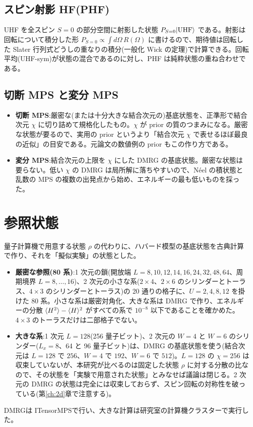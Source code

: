 \subsection{スピン射影 HF(PHF)}
UHF を全スピン $S=0$ の部分空間に射影した状態 $P_{S=0}|\rm UHF\rangle$ である\cite{jimenezhoyos2012}。射影は回転について積分した形 $P_{S=0}\propto\int d\Omega\,R(\Omega)$ に書けるので、期待値は回転した Slater 行列式どうしの重なりの積分(一般化 Wick の定理)で計算できる。回転平均(UHF-sym)が状態の混合であるのに対し、PHF は純粋状態の重ね合わせである。

\subsection{切断 MPS と変分 MPS}
\begin{itemize}
  \item \textbf{切断 MPS}:厳密な(または十分大きな結合次元の)基底状態を、正準形で結合次元 $\chi$ に切り詰めて規格化したもの。$\chi$ が prior の質のつまみになる。厳密な状態が要るので、実用の prior というより「結合次元 $\chi$ で表せるほぼ最良の近似」の目安である。元論文の数値例の prior もこの作り方である。
  \item \textbf{変分 MPS}:結合次元の上限を $\chi$ にした DMRG の基底状態。厳密な状態は要らない。低い $\chi$ の DMRG は局所解に落ちやすいので、Néel の積状態と乱数の MPS の複数の出発点から始め、エネルギーの最も低いものを採った。
\end{itemize}

\section{参照状態}
\label{sec:reference}

量子計算機で用意する状態 $\rho$ の代わりに、ハバード模型の基底状態を古典計算で作り、それを「擬似実験」の状態とした。
\begin{itemize}
  \item \textbf{厳密な参照(80 系)}:1 次元の鎖(開放端 $L=8,10,12,14,16,24,32,48,64$、周期境界 $L=8,\dots,16$)、2 次元の小さな系($2\times4$、$2\times6$ のシリンダーとトーラス、$4\times3$ のシリンダーとトーラス)の 20 通りの格子に、$U=2,4,8,12$ を掛けた 80 系。小さな系は厳密対角化、大きな系は DMRG で作り、エネルギーの分散 $\langle H^2\rangle-\langle H\rangle^2$ がすべての系で $10^{-8}$ 以下であることを確かめた。$4\times3$ のトーラスだけは二部格子でない。
  \item \textbf{大きな系}:1 次元 $L=128$(256 量子ビット)、2 次元の $W=4$ と $W=6$ のシリンダー($L_x=8$、64 と 96 量子ビット)は、DMRG の基底状態を使う(結合次元は $L=128$ で $256$、$W=4$ で $192$、$W=6$ で $512$)。$L=128$ の $\chi=256$ は収束していないが、本研究が比べるのは固定した状態 $\rho$ に対する分散の比なので、その状態を「実験で用意された状態」とみなせば議論は閉じる。2 次元の DMRG の状態は完全には収束しておらず、スピン回転の対称性を破っている(第\ref{ch:2d}章で注意する)。
\end{itemize}
DMRG\cite{white1992,schollwock2011}は ITensorMPS\cite{itensor}で行い、大きな計算は研究室の計算機クラスターで実行した。

